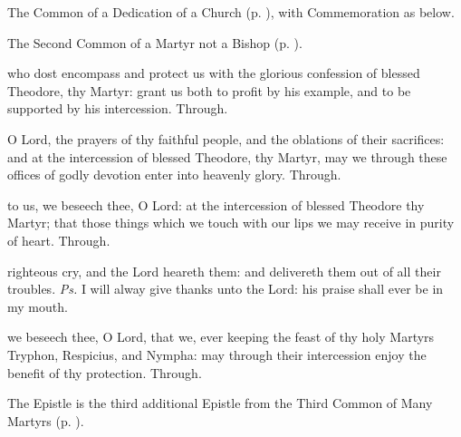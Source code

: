 
\begin{rubric}
	The Common of a Dedication of a Church (p. \pageref{CommonDedication}), with Commemoration  as below.
\end{rubric}



\begin{rubric}
	The Second Common of a Martyr not a Bishop (p. \pageref{CommonMartyrNotBishopII}).
\end{rubric}

\collect
{} who dost encompass and protect us with the glorious confession of blessed Theodore, thy Martyr: grant us both to profit by his example, and to be supported by his intercession. Through.

\secret
{} O Lord, the prayers of thy faithful people, and the oblations of their sacrifices: and at the intercession of blessed Theodore, thy Martyr, may we through these offices of godly devotion enter into heavenly glory. Through.

\postcommunion
{} to us, we beseech thee, O Lord: at the intercession of blessed Theodore thy Martyr; that those things which we touch with our lips we may receive in purity of heart. Through.


\clearpage
{}

\introit
{} righteous cry, and the Lord heareth them: and delivereth them out of all their troubles. \textit{Ps.} I will alway give thanks unto the Lord: his praise shall ever be in my mouth.

\collect
{} we beseech thee, O Lord, that we, ever keeping the feast of thy holy Martyrs Tryphon, Respicius, and Nympha: may through their intercession enjoy the benefit of thy protection. Through.

\begin{rubric}
	The Epistle is the third additional Epistle from the Third Common of Many Martyrs (p. \pageref{Romans818}).
\end{rubric}


